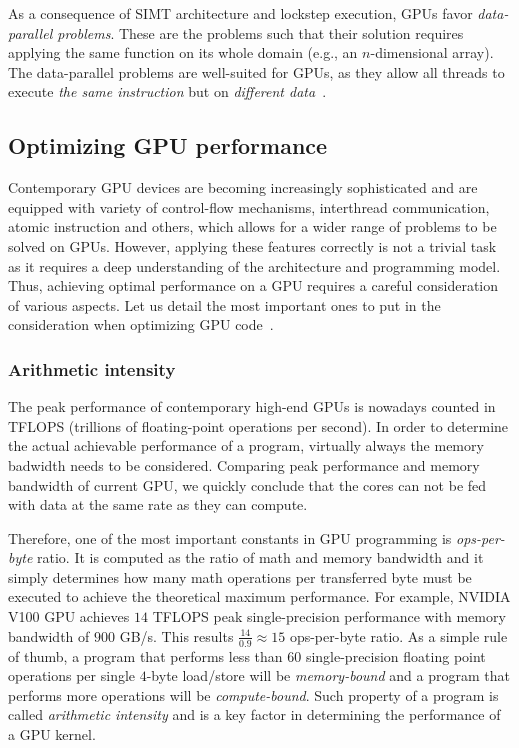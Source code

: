 As a consequence of SIMT architecture and lockstep execution, GPUs favor \emph{data-parallel problems}. These are the problems such that their solution requires applying the same function on its whole domain (e.g., an $n$-dimensional array). The data-parallel problems are well-suited for GPUs, as they allow all threads to execute \emph{the same instruction} but on \emph{different data}~\cite{navarro2014survey}.

\subsection{Optimizing GPU performance}
\label{sec:gpu_optim}

Contemporary GPU devices are becoming increasingly sophisticated and are equipped with variety of control-flow mechanisms, interthread communication, atomic instruction and others, which allows for a wider range of problems to be solved on GPUs. However, applying these features correctly is not a trivial task as it requires a deep understanding of the architecture and programming model. Thus, achieving optimal performance on a GPU requires a careful consideration of various aspects. Let us detail the most important ones to put in the consideration when optimizing GPU code~\cite{pratx2011gpu}.

\subsubsection{Arithmetic intensity}
\label{sec:arithmetic_int}

The peak performance of contemporary high-end GPUs is nowadays counted in TFLOPS (trillions of floating-point operations per second). In order to determine the actual achievable performance of a program, virtually always the memory badwidth needs to be considered. Comparing peak performance and memory bandwidth of current GPU, we quickly conclude that the cores can not be fed with data at the same rate as they can compute. 

Therefore, one of the most important constants in GPU programming is \emph{ops-per-byte} ratio. It is computed as the ratio of math and memory bandwidth and it simply determines how many math operations per transferred byte must be executed to achieve the theoretical maximum performance. For example, NVIDIA V100 GPU achieves $14$ TFLOPS peak single-precision performance with memory bandwidth of $900$ GB/s. This results $\frac{14}{0.9} \approx 15$ ops-per-byte ratio. As a simple rule of thumb, a program that performs less than $60$ single-precision floating point operations per single $4$-byte load/store will be \emph{memory-bound} and a program that performs more operations will be \emph{compute-bound}. Such property of a program is called \emph{arithmetic intensity} and is a key factor in determining the performance of a GPU kernel.

